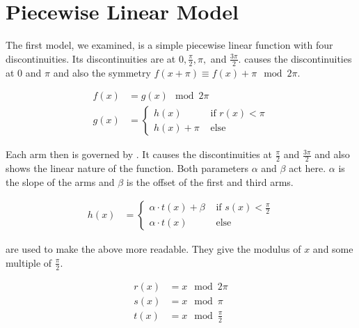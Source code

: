 \section{Piecewise Linear Model}


The first model, we examined, is a simple piecewise linear function with four discontinuities.
Its discontinuities are at $0, \frac{\pi}{2}, \pi,$ and $\frac{3 \pi}{2}$.
 causes the discontinuities at $0$ and $\pi$ and also the symmetry $f(x + \pi) \equiv f(x) + \pi \mod 2 \pi$.

\begin{align}
    f(x) & = g(x) \mod 2 \pi \label{equ:pcw.lin.f} \\
    g(x) & = \begin{cases}
        h(x) & \text{ if } r(x) < \pi \\
        h(x) + \pi & \text{ else}
    \end{cases} \label{equ:pcw.lin.sympi}
\end{align}

Each arm then is governed by .
It causes the discontinuities at $\frac{\pi}{2}$ and $\frac{3 \pi}{2}$ and also shows the linear nature of the function.
Both parameters $\alpha$ and $\beta$ act here.
$\alpha$ is the slope of the arms and $\beta$ is the offset of the first and third arms.

\begin{align}
    h(x) & = \begin{cases}
        \alpha \cdot t(x) + \beta & \text{ if } s(x) < \frac{\pi}{2} \\
        \alpha \cdot t(x) & \text{ else}
    \end{cases} \label{equ:pcw.lin.discpihalves}
\end{align}

 are used to make the above more readable.
They give the modulus of $x$ and some multiple of $\frac{\pi}{2}$.

\begin{align}
    r(x) & = x \mod 2 \pi \label{equ:pcw.lin.r} \\
    s(x) & = x \mod \pi \\
    t(x) & = x \mod \frac{\pi}{2} \label{equ:pcw.lin.t}
\end{align}





